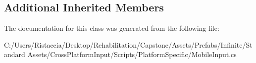 \subsection*{Additional Inherited Members}


The documentation for this class was generated from the following file\+:\begin{DoxyCompactItemize}
\item 
C\+:/\+Users/\+Ristaccia/\+Desktop/\+Rehabilitation/\+Capstone/\+Assets/\+Prefabs/\+Infinite/\+Standard Assets/\+Cross\+Platform\+Input/\+Scripts/\+Platform\+Specific/Mobile\+Input.\+cs\end{DoxyCompactItemize}
